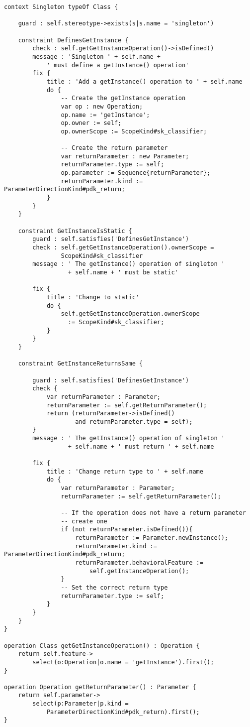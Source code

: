 \begin{lstlisting}[basicstyle=\ttfamily\footnotesize, flexiblecolumns=true, numbers=none, nolol=true, caption=EVL Module for Validating Singletons, label=lst:CaseStudy, numbers=left, language=EVL, tabsize=2]
context Singleton typeOf Class {
	
	guard : self.stereotype->exists(s|s.name = 'singleton')
	
	constraint DefinesGetInstance {
		check : self.getGetInstanceOperation()->isDefined()
		message : 'Singleton ' + self.name + 
			' must define a getInstance() operation'
		fix {
			title : 'Add a getInstance() operation to ' + self.name
			do {
				-- Create the getInstance operation
				var op : new Operation;
				op.name := 'getInstance';
				op.owner := self;
				op.ownerScope := ScopeKind#sk_classifier;
				
				-- Create the return parameter
				var returnParameter : new Parameter;
				returnParameter.type := self;
				op.parameter := Sequence{returnParameter};
				returnParameter.kind := ParameterDirectionKind#pdk_return;
			}
		}
	}
	
	constraint GetInstanceIsStatic {
		guard : self.satisfies('DefinesGetInstance')
		check : self.getGetInstanceOperation().ownerScope = 
		        ScopeKind#sk_classifier
		message : ' The getInstance() operation of singleton ' 
		          + self.name + ' must be static'
	
		fix {
			title : 'Change to static'
			do {
				self.getGetInstanceOperation.ownerScope 
				  := ScopeKind#sk_classifier;
			}
		}
	}
	
	constraint GetInstanceReturnsSame {
	
		guard : self.satisfies('DefinesGetInstance')
		check {
			var returnParameter : Parameter;
			returnParameter := self.getReturnParameter();
			return (returnParameter->isDefined() 
			        and returnParameter.type = self);
		}
		message : ' The getInstance() operation of singleton ' 
		          + self.name + ' must return ' + self.name
			
		fix {
			title : 'Change return type to ' + self.name
			do {
				var returnParameter : Parameter;
				returnParameter := self.getReturnParameter();
				
				-- If the operation does not have a return parameter
				-- create one
				if (not returnParameter.isDefined()){
					returnParameter := Parameter.newInstance();
					returnParameter.kind := ParameterDirectionKind#pdk_return;
					returnParameter.behavioralFeature := 
						self.getInstanceOperation();
				}
				-- Set the correct return type
				returnParameter.type := self;
			}
		}
	}
}

operation Class getGetInstanceOperation() : Operation {
	return self.feature->
		select(o:Operation|o.name = 'getInstance').first();
}

operation Operation getReturnParameter() : Parameter {
	return self.parameter->
		select(p:Parameter|p.kind = 
			ParameterDirectionKind#pdk_return).first();
}
\end{lstlisting}